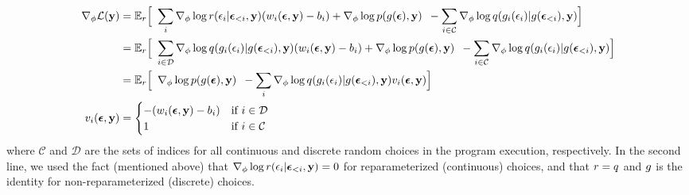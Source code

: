 \begin{align}
\begin{split}
\gradparams \elbo
&= \expect_\reparamDist \Bigl[ \hspace{0.5em}
\sum_{i} \gradparams \log \reparamDist(\reparamVar_i | \reparamVars_{<i}, \observedVars) ( w_i(\reparamVars, \observedVars) - b_i )
+ \gradparams \log p(\xformedVars, \observedVars) \hspace{0.5em}
- \sum_{i \in \mathcal{C}} \gradparams \log \guide(\reparamXform_i(\reparamVar_i) | \reparamXform(\reparamVars_{<i}), \observedVars)
\Bigr]\\
%
&= \expect_\reparamDist \Bigl[ \hspace{0.5em}
\sum_{i \in \mathcal{D}} \gradparams \log \guide(\reparamXform_i(\reparamVar_i) | \reparamXform(\reparamVars_{<i}), \observedVars) ( w_i(\reparamVars, \observedVars) - b_i )
+ \gradparams \log p(\xformedVars, \observedVars) \hspace{0.5em}
- \sum_{i \in \mathcal{C}} \gradparams \log \guide(\reparamXform_i(\reparamVar_i) | \reparamXform(\reparamVars_{<i}), \observedVars)
\Bigr]\\
%
&= \expect_\reparamDist \Bigl[ \hspace{0.5em}
\gradparams \log p(\xformedVars, \observedVars) \hspace{0.5em}
- \sum_{i} \gradparams \log \guide(\reparamXform_i(\reparamVar_i) | \reparamXform(\reparamVars_{<i}), \observedVars) v_i(\reparamVars, \observedVars)
\Bigr]\\
v_i(\reparamVars, \observedVars) &=
\begin{cases}
- ( w_i(\reparamVars, \observedVars) - b_i ) & \text{if } i \in \mathcal{D}\\
1 & \text{if } i \in \mathcal{C}
\end{cases}
\end{split}
\label{eq:finalEstimator}
\end{align}
where $\mathcal{C}$ and $\mathcal{D}$ are the sets of indices for all continuous and discrete random choices in the program execution, respectively.
In the second line, we used the fact (mentioned above) that $\nabla_\phi \log r(\epsilon_i | \bm{\epsilon}_{<i}, \mathbf{y}) = 0$ for reparameterized (continuous) choices, and that $r = q$ and $g$ is the identity for non-reparameterized (discrete) choices.

